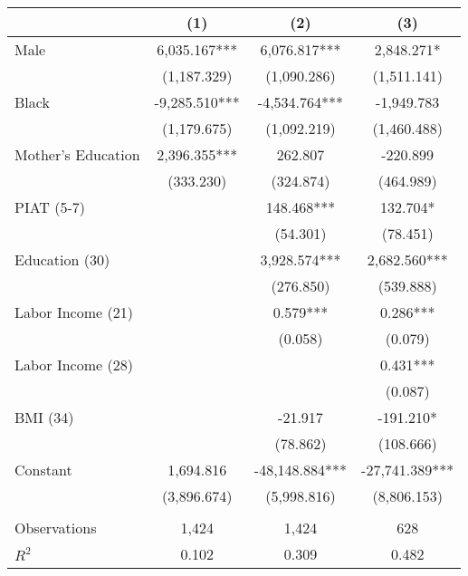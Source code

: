 \begin{tabular}{lccc} \toprule
 & (1) & (2) & (3) \\ \midrule 
Male & 6,035.167*** & 6,076.817*** & 2,848.271* \\
 & (1,187.329) & (1,090.286) & (1,511.141) \\
Black & -9,285.510*** & -4,534.764*** & -1,949.783 \\
 & (1,179.675) & (1,092.219) & (1,460.488) \\
Mother's Education & 2,396.355*** & 262.807 & -220.899 \\
 & (333.230) & (324.874) & (464.989) \\
PIAT (5-7) &  & 148.468*** & 132.704* \\
 &  & (54.301) & (78.451) \\
Education (30) &  & 3,928.574*** & 2,682.560*** \\
 &  & (276.850) & (539.888) \\
Labor Income (21)&  & 0.579*** & 0.286*** \\
 &  & (0.058) & (0.079) \\
Labor Income (28) &  &  & 0.431*** \\
 &  &  & (0.087) \\
BMI (34)&  & -21.917 & -191.210* \\
 &  & (78.862) & (108.666) \\
Constant & 1,694.816 & -48,148.884*** & -27,741.389*** \\
 & (3,896.674) & (5,998.816) & (8,806.153) \\ \\ \midrule
 Observations & 1,424 & 1,424 & 628 \\
$R^2$ & 0.102 & 0.309 & 0.482 \\ \bottomrule
\end{tabular}

